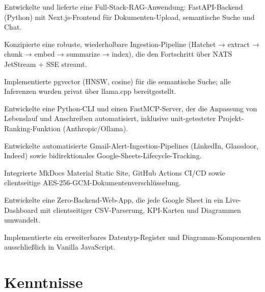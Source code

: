 \documentclass[10pt,a4paper]{resume}
\begin{document}
\bullets
  \item Entwickelte und lieferte eine Full-Stack-RAG-Anwendung: FastAPI-Backend (Python) mit Next.js-Frontend für Dokumenten-Upload, semantische Suche und Chat.
  \item Konzipierte eine robuste, wiederholbare Ingestion-Pipeline (Hatchet → extract → chunk → embed → summarize → index), die den Fortschritt über NATS JetStream + SSE streamt.
  \item Implementierte pgvector (HNSW, cosine) für die semantische Suche; alle Inferenzen wurden privat über llama.cpp bereitgestellt.
\bulletsend
\vspace{1.0pt}
\bullets
  \item Entwickelte eine Python-CLI und einen FastMCP-Server, der die Anpassung von Lebenslauf und Anschreiben automatisiert, inklusive unit-getesteter Projekt-Ranking-Funktion (Anthropic/Ollama).
  \item Entwickelte automatisierte Gmail-Alert-Ingestion-Pipelines (LinkedIn, Glassdoor, Indeed) sowie bidirektionales Google-Sheets-Lifecycle-Tracking.
  \item Integrierte MkDocs Material Static Site, GitHub Actions CI/CD sowie clientseitige AES-256-GCM-Dokumentenverschlüsselung.
\bulletsend
\vspace{1.0pt}
\bullets
  \item Entwickelte eine Zero-Backend-Web-App, die jede Google Sheet in ein Live-Dashboard mit clientseitiger CSV-Parserung, KPI-Karten und Diagrammen umwandelt.
  \item Implementierte ein erweiterbares Datentyp-Register und Diagramm-Komponenten ausschließlich in Vanilla JavaScript.
\bulletsend

\section{Kenntnisse}
\end{document}
